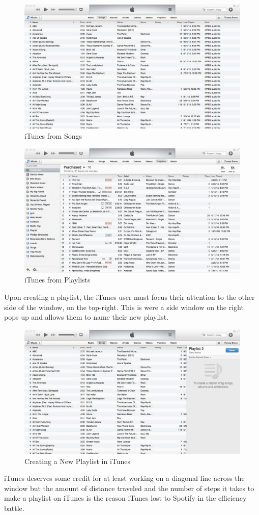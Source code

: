 \documentclass[a4paper]{article}
\begin{document}
\begin{figure}[H]
\centering
\includegraphics[width=.6\textwidth]{itunesfromsongs.jpg}
\caption{\label{heuristic: iTunesSongs} iTunes from Songs}
\end{figure}
\begin{figure}[H]
\centering
\includegraphics[width=.6\textwidth]{itunesfromplaylists.jpg}
\caption{\label{heuristic: iTunesPlaylists} iTunes from Playlists}
\end{figure}

Upon creating a playlist, the iTunes user must focus their attention to the other side of the window, on the top-right. This is were a side window on the right pops up and allows them to name their new playlist.

\begin{figure}[H]
\centering
\includegraphics[width=.6\textwidth]{itunescreateplaylist.jpg}
\caption{\label{heuristic: iTunesPlaylistCreate} Creating a New Playlist in iTunes}
\end{figure}

iTunes deserves some credit for at least working on a diagonal line across the window but the amount of distance traveled and the number of steps it takes to make a playlist on iTunes is the reason iTunes lost to Spotify in the efficiency battle.
\end{document}
